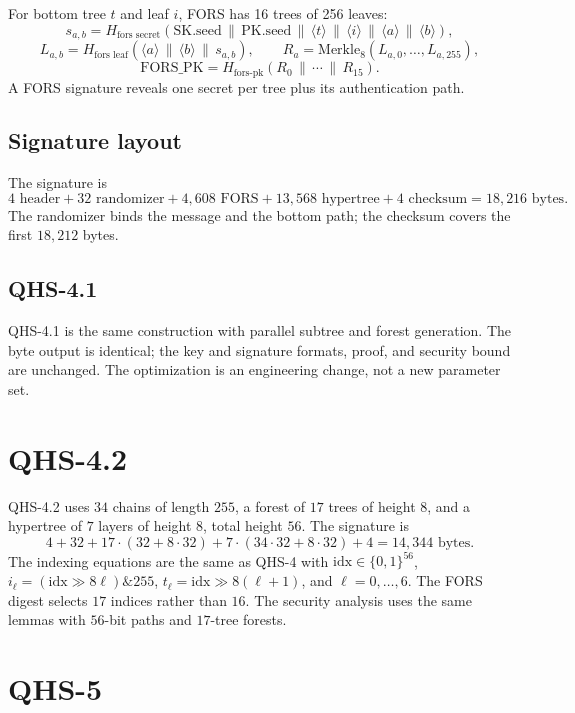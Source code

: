 \documentclass[11pt,a4paper]{article}
\theoremstyle{remark}
\newcommand{\concat}{\,\|\,}
\newcommand{\bits}{\{0,1\}}
\begin{document}
For bottom tree \(t\) and leaf \(i\), FORS has 16 trees of 256 leaves:
\[
s_{a,b}=H_{\text{fors secret}}
(\mathrm{SK.seed}\concat\mathrm{PK.seed}\concat\langle t\rangle
\concat\langle i\rangle\concat\langle a\rangle\concat\langle b\rangle),
\]
\[
L_{a,b}=H_{\text{fors leaf}}(\langle a\rangle\concat\langle b\rangle\concat s_{a,b}),
\qquad
R_a=\mathrm{Merkle}_8(L_{a,0},\dots,L_{a,255}),
\]
\[
\mathrm{FORS\_PK}=H_{\text{fors-pk}}(R_0\concat\cdots\concat R_{15}).
\]
A FORS signature reveals one secret per tree plus its authentication path.

\subsection{Signature layout}

The signature is
\[
4\text{ header}+32\text{ randomizer}+4{,}608\text{ FORS}+13{,}568\text{ hypertree}+4\text{ checksum}
=18{,}216\text{ bytes}.
\]
The randomizer binds the message and the bottom path; the checksum covers the
first \(18{,}212\) bytes.

\subsection{QHS-4.1}

QHS-4.1 is the same construction with parallel subtree and forest generation.
The byte output is identical; the key and signature formats, proof, and security
bound are unchanged. The optimization is an engineering change, not a new
parameter set.

\section{QHS-4.2}

QHS-4.2 uses \(34\) chains of length \(255\), a forest of \(17\) trees of height
\(8\), and a hypertree of \(7\) layers of height \(8\), total height \(56\).
The signature is
\[
4+32+17\cdot(32+8\cdot 32)+7\cdot(34\cdot 32+8\cdot 32)+4
=14{,}344\text{ bytes}.
\]
The indexing equations are the same as QHS-4 with
\(\mathrm{idx}\in\bits^{56}\), \(i_\ell=(\mathrm{idx}\gg 8\ell)\&255\),
\(t_\ell=\mathrm{idx}\gg 8(\ell+1)\), and \(\ell=0,\dots,6\). The FORS digest
selects \(17\) indices rather than \(16\). The security analysis uses the same
lemmas with \(56\)-bit paths and \(17\)-tree forests.

\section{QHS-5}
\end{document}
